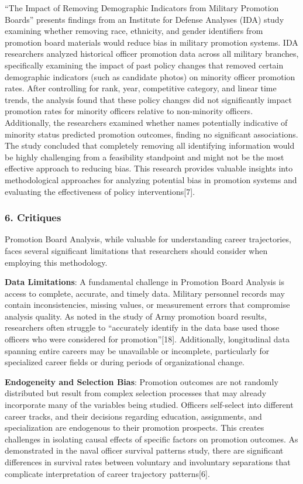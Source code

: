 \documentclass[./main.tex]{subfiles}
\begin{document}
``The Impact of Removing Demographic Indicators from Military Promotion
Boards'' presents findings from an Institute for Defense Analyses (IDA)
study examining whether removing race, ethnicity, and gender identifiers
from promotion board materials would reduce bias in military promotion
systems. IDA researchers analyzed historical officer promotion data
across all military branches, specifically examining the impact of past
policy changes that removed certain demographic indicators (such as
candidate photos) on minority officer promotion rates. After controlling
for rank, year, competitive category, and linear time trends, the
analysis found that these policy changes did not significantly impact
promotion rates for minority officers relative to non-minority officers.
Additionally, the researchers examined whether names potentially
indicative of minority status predicted promotion outcomes, finding no
significant associations. The study concluded that completely removing
all identifying information would be highly challenging from a
feasibility standpoint and might not be the most effective approach to
reducing bias. This research provides valuable insights into
methodological approaches for analyzing potential bias in promotion
systems and evaluating the effectiveness of policy interventions{[}7{]}.

\subsubsection{6. Critiques}\label{critiques}

Promotion Board Analysis, while valuable for understanding career
trajectories, faces several significant limitations that researchers
should consider when employing this methodology.

\textbf{Data Limitations}: A fundamental challenge in Promotion Board
Analysis is access to complete, accurate, and timely data. Military
personnel records may contain inconsistencies, missing values, or
measurement errors that compromise analysis quality. As noted in the
study of Army promotion board results, researchers often struggle to
``accurately identify in the data base used those officers who were
considered for promotion''{[}18{]}. Additionally, longitudinal data
spanning entire careers may be unavailable or incomplete, particularly
for specialized career fields or during periods of organizational
change.

\textbf{Endogeneity and Selection Bias}: Promotion outcomes are not
randomly distributed but result from complex selection processes that
may already incorporate many of the variables being studied. Officers
self-select into different career tracks, and their decisions regarding
education, assignments, and specialization are endogenous to their
promotion prospects. This creates challenges in isolating causal effects
of specific factors on promotion outcomes. As demonstrated in the naval
officer survival patterns study, there are significant differences in
survival rates between voluntary and involuntary separations that
complicate interpretation of career trajectory patterns{[}6{]}.
\end{document}
